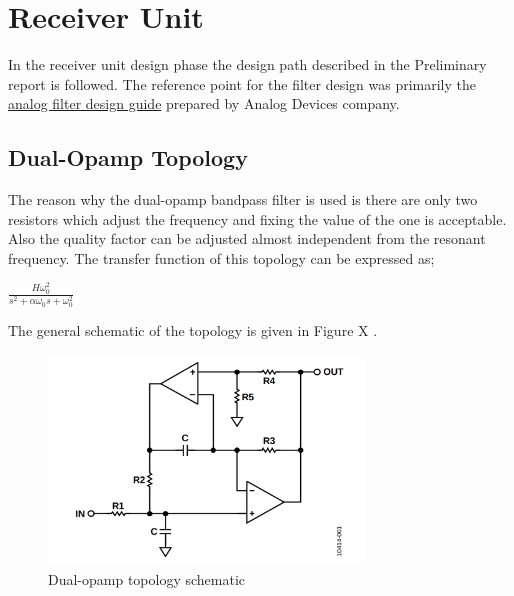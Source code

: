 \documentclass[letterpaper,12pt]{article}
\begin{document}
\section{Receiver Unit}
In the receiver unit design phase the design path described in the Preliminary report is followed. The reference point for the filter design was primarily the \href{https://www.analog.com/media/en/training-seminars/design-handbooks/basic-linear-design/chapter8.pdf}{analog filter design guide} prepared by Analog Devices company.
\subsection{Dual-Opamp Topology}
The reason why the dual-opamp bandpass filter is used is there are only two resistors which adjust the frequency and fixing the value of the one is acceptable. Also the quality factor can be adjusted almost independent from the resonant frequency. The transfer function of this topology can be expressed as;
\begin{center}
    $ \frac{H \omega_0^2 }{s^2 + \alpha \omega_0 s + \omega_0 ^2} $
    
\end{center}
The general schematic of the topology is given in Figure X .
\begin{figure}[H]
    \centering
    \includegraphics[width = 0.75\textwidth]{dualopamp.png}
    \caption{Dual-opamp topology schematic}
\end{figure} 
\end{document}

